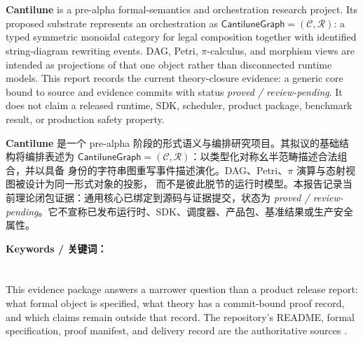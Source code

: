 \clearpage
\chapter*{\MWLabelAbstract}

\begin{MWAbstractBox}
\textbf{Cantilune} is a pre-alpha formal-semantics and orchestration research project. Its
proposed substrate represents an orchestration as \(\mathsf{CantiluneGraph}=(\mathcal C,\mathcal R)\):
a typed symmetric monoidal category for legal composition together with identified
string-diagram rewriting events. DAG, Petri, \(\pi\)-calculus, and morphism views are intended as
projections of that one object rather than disconnected runtime models. This report records the
current theory-closure evidence: a generic core bound to source and evidence commits with status
\emph{proved / review-pending}. It does not claim a released runtime, SDK, scheduler, product
package, benchmark result, or production safety property.
\end{MWAbstractBox}

\vspace{4mm}

\begin{MWAbstractBox}
\textbf{Cantilune} 是一个 pre-alpha 阶段的形式语义与编排研究项目。其拟议的基础结构将编排表述为
\(\mathsf{CantiluneGraph}=(\mathcal C,\mathcal R)\)：以类型化对称幺半范畴描述合法组合，并以具备
身份的字符串图重写事件描述演化。DAG、Petri、\(\pi\) 演算与态射视图被设计为同一形式对象的投影，
而不是彼此脱节的运行时模型。本报告记录当前理论闭包证据：通用核心已绑定到源码与证据提交，状态为
\emph{proved / review-pending}。它不宣称已发布运行时、SDK、调度器、产品包、基准结果或生产安全属性。
\end{MWAbstractBox}

\vspace{4mm}
{\small\color{MWMuted}\textbf{Keywords / 关键词：} \MWKeywords}

\clearpage
\chapter*{\MWLabelExecutiveSummary}

This evidence package answers a narrower question than a product release report: what formal
object is specified, what theory has a commit-bound proof record, and which claims remain outside
that record. The repository's README, formal specification, proof manifest, and delivery record
are the authoritative sources \citep{cantiluneReadme,cantiluneSpec,cantiluneManifest,cantiluneClosure}.

